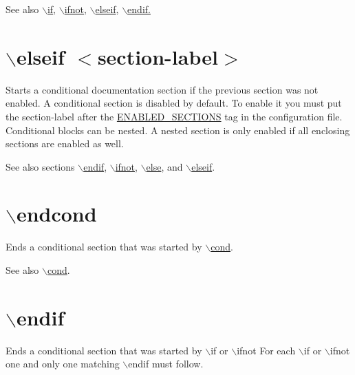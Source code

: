 \begin{DoxySeeAlso}{See also}
\hyperlink{commands_cmdif}{$\backslash$if}, \hyperlink{commands_cmdifnot}{$\backslash$ifnot}, \hyperlink{commands_cmdelseif}{$\backslash$elseif}, \hyperlink{commands_cmdendif}{$\backslash$endif.}
\end{DoxySeeAlso}


 \hypertarget{commands_cmdelseif}{}\section{$\backslash$elseif $<$section-\/label$>$}\label{commands_cmdelseif}
 Starts a conditional documentation section if the previous section was not enabled. A conditional section is disabled by default. To enable it you must put the section-\/label after the \hyperlink{config_cfg_enabled_sections}{ENABLED\_\-SECTIONS} tag in the configuration file. Conditional blocks can be nested. A nested section is only enabled if all enclosing sections are enabled as well.

\begin{DoxySeeAlso}{See also}
sections \hyperlink{commands_cmdendif}{$\backslash$endif}, \hyperlink{commands_cmdifnot}{$\backslash$ifnot}, \hyperlink{commands_cmdelse}{$\backslash$else}, and \hyperlink{commands_cmdelseif}{$\backslash$elseif}.
\end{DoxySeeAlso}


 \hypertarget{commands_cmdendcond}{}\section{$\backslash$endcond}\label{commands_cmdendcond}
 Ends a conditional section that was started by \hyperlink{commands_cmdcond}{$\backslash$cond}.

\begin{DoxySeeAlso}{See also}
\hyperlink{commands_cmdcond}{$\backslash$cond}.
\end{DoxySeeAlso}


 \hypertarget{commands_cmdendif}{}\section{$\backslash$endif}\label{commands_cmdendif}
 Ends a conditional section that was started by {\ttfamily $\backslash$if} or {\ttfamily $\backslash$ifnot} For each {\ttfamily $\backslash$if} or {\ttfamily $\backslash$ifnot} one and only one matching {\ttfamily $\backslash$endif} must follow.

